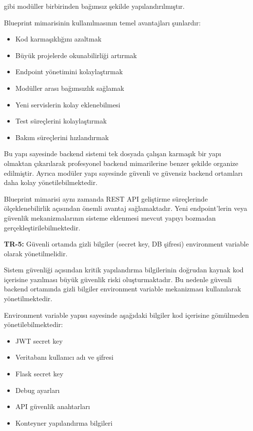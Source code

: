 gibi modüller birbirinden bağımsız şekilde yapılandırılmıştır.

Blueprint mimarisinin kullanılmasının temel avantajları şunlardır:

\begin{itemize}[leftmargin=*]
    \item Kod karmaşıklığını azaltmak
    \item Büyük projelerde okunabilirliği artırmak
    \item Endpoint yönetimini kolaylaştırmak
    \item Modüller arası bağımsızlık sağlamak
    \item Yeni servislerin kolay eklenebilmesi
    \item Test süreçlerini kolaylaştırmak
    \item Bakım süreçlerini hızlandırmak
\end{itemize}

Bu yapı sayesinde backend sistemi tek dosyada çalışan karmaşık bir yapı olmaktan çıkarılarak profesyonel backend mimarilerine benzer şekilde organize edilmiştir. Ayrıca modüler yapı sayesinde güvenli ve güvensiz backend ortamları daha kolay yönetilebilmektedir.

Blueprint mimarisi aynı zamanda REST API geliştirme süreçlerinde ölçeklenebilirlik açısından önemli avantaj sağlamaktadır. Yeni endpoint’lerin veya güvenlik mekanizmalarının sisteme eklenmesi mevcut yapıyı bozmadan gerçekleştirilebilmektedir.

\noindent\textbf{TR-5:} Güvenli ortamda gizli bilgiler (secret key, DB şifresi) environment variable olarak yönetilmelidir.

Sistem güvenliği açısından kritik yapılandırma bilgilerinin doğrudan kaynak kod içerisine yazılması büyük güvenlik riski oluşturmaktadır. Bu nedenle güvenli backend ortamında gizli bilgiler environment variable mekanizması kullanılarak yönetilmektedir.

Environment variable yapısı sayesinde aşağıdaki bilgiler kod içerisine gömülmeden yönetilebilmektedir:

\begin{itemize}[leftmargin=*]
    \item JWT secret key
    \item Veritabanı kullanıcı adı ve şifresi
    \item Flask secret key
    \item Debug ayarları
    \item API güvenlik anahtarları
    \item Konteyner yapılandırma bilgileri
\end{itemize}

